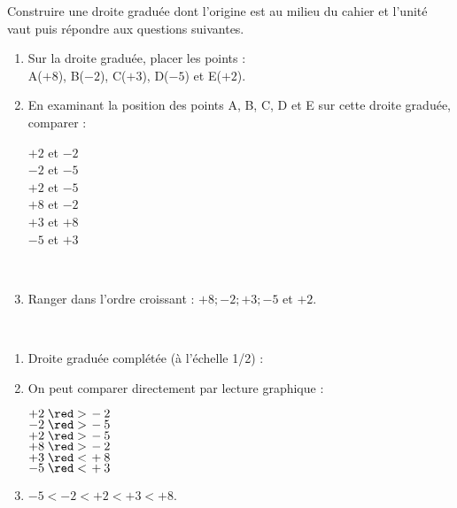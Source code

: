 \begin{exercice}
    Construire une droite graduée dont l'origine est au milieu du cahier et l'unité vaut  puis répondre aux questions suivantes.
    \begin{enumerate}
       \item Sur la droite graduée, placer les points : \\
          A($+8$), B($-2$), C($+3$), D($-5$) et E($+2$).
       \item En examinant la position des points A, B, C, D et E sur cette droite graduée, comparer : \\ [-9mm]
          \begin{multicols}{3}
             $+2$ et $-2$ \\ \smallskip
             $-2$ et $-5$ \\ \smallskip
             $+2$ et $-5$ \\
             $+8$ et $-2$ \\
             $+3$ et $+8$ \\
             $-5$ et $+3$
          \end{multicols}
          \ \\ [-15mm]
       \item Ranger dans l'ordre croissant : $+8 ; -2 ; +3 ; -5$ et $+2$.
    \end{enumerate}
 \end{exercice}
 
 \begin{corrige}
    \ \\ [-5mm]
    \begin{enumerate}
       \item Droite graduée complétée (à l'échelle 1/2) : \\ [2mm]
       \hspace*{-10mm} 
       \item On peut comparer directement par lecture graphique :
          \begin{multicols}{3}
             $+2 \; {\red >} \, -2$ \\ \smallskip
             $-2  \; {\red >} \, -5$ \\ \smallskip
             $+2 \; {\red >} \, -5$ \\
             $+8 \; {\red >} \, -2$ \\
             $+3 \; {\red <} \, +8$ \\
             $-5 \; {\red <} \, +3$
          \end{multicols}
          \vspace*{-3mm}
       \item \red$-5<-2<+2<+3<+8$.
    \end{enumerate}
 \end{corrige}